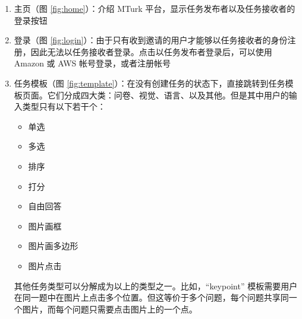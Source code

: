 \begin{enumerate}
    \item 主页（图 \ref{fig:home}）：介绍 MTurk 平台，显示任务发布者以及任务接收者的登录按钮
    \item 登录（图 \ref{fig:login}）：由于只有收到邀请的用户才能够以任务接收者的身份注册，因此无法以任务接收者登录。点击以任务发布者登录后，可以使用 Amazon 或 AWS 帐号登录，或者注册帐号
    \item 任务模板（图 \ref{fig:template}）：在没有创建任务的状态下，直接跳转到任务模板页面。它们分成四大类：问卷、视觉、语言、以及其他。但是其中用户的输入类型只有以下若干个：
    \begin{multicols}{2}
        \begin{itemize}
            \item 单选
            \item 多选
            \item 排序
            \item 打分
            \item 自由回答
            \item 图片画框
            \item 图片画多边形
            \item 图片点击
        \end{itemize}
    \end{multicols}
    其他任务类型可以分解成为以上的类型之一。比如，“keypoint” 模板需要用户在同一题中在图片上点击多个位置。但这等价于多个问题，每个问题共享同一个图片，而每个问题只需要点击图片上的一个点。


\end{enumerate}
